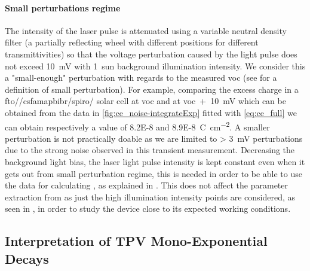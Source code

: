 	\paragraph{Small perturbations regime}\label{tpv_perturbation}
	The intensity of the laser pulse is attenuated using a variable neutral density filter (a partially reflecting wheel with different positions for different transmittivities) so that the voltage perturbation caused by the light pulse does not exceed \SI{10}{\mV} with 1~sun background illumination intensity.
	We consider this a "small\hyp{}enough" perturbation with regards to the measured \gls{voc} (see  for a definition of small perturbation).
	For example, comparing the excess charge in a \gls{fto}\-/\-/\gls{csfamapbibr}\-/\gls{spiro}\-/ solar cell at \gls{voc} and at \gls{voc}~+~\SI{10}{\mV} which can be obtained from the data in \cref{fig:ce_noise-integrateExp} fitted with \cref{eq:ce_full} we can obtain respectively a value of \SI{8.2E-8}{} and \SI{8.9E-8}{\coulomb\per\square\cm}.
	A smaller perturbation is not practically doable as we are limited to \SI{> 3}{\mV} perturbations due to the strong noise observed in this transient measurement.
	Decreasing the background light bias, the laser light pulse intensity is kept constant even when it gets out from small perturbation regime, this is needed in order to be able to use the  data for calculating , as explained in .
	This does not affect the parameter extraction from  as just the high illumination intensity points are considered, as seen in , in order to study the device close to its expected working conditions.

	\subsection{Interpretation of TPV Mono\hyp{}Exponential Decays}

